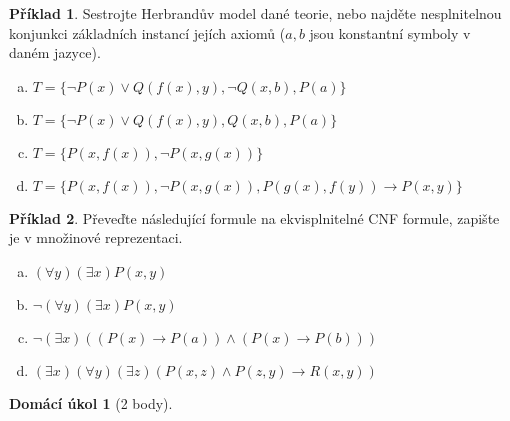 \documentclass[a4paper]{article}
\theoremstyle{definition}
\newtheorem{problem}{Příklad}
\newtheorem*{ukol}{Domácí úkol}
\begin{document}
\medskip\begin{problem} Sestrojte Herbrandův model dané teorie, nebo najděte nesplnitelnou konjunkci základních instancí jejích axiomů ($a,b$ jsou konstantní symboly v daném jazyce).
\begin{enumerate}[(a)]
    \item $T=\{\neg P(x)\vee Q(f(x),y), \neg Q(x,b), P(a)\}$
    \item $T=\{\neg P(x)\vee Q(f(x),y), Q(x,b), P(a)\}$
    \item $T=\{P(x,f(x)),\neg P(x,g(x))\}$
    \item $T=\{P(x,f(x)),\neg P(x,g(x)), P(g(x),f(y)) \to P(x,y)\}$
\end{enumerate}
\end{problem}


\medskip\begin{problem} Převeďte následující formule na ekvisplnitelné CNF formule, zapište je v množinové reprezentaci.
\begin{enumerate}[(a)]
    \item $(\forall y)(\exists x)P(x,y)$
    \item $\neg (\forall y)(\exists x)P(x,y)$
    \item $\neg (\exists x)((P(x)\to P(a))\wedge (P(x)\to P(b)))$
    \item $(\exists x)(\forall y)(\exists z)(P(x,z)\wedge P(z,y) \to R(x,y))$
\end{enumerate}
\end{problem}
    
   
\medskip\begin{ukol}[2 body]

\end{ukol}
\end{document}
